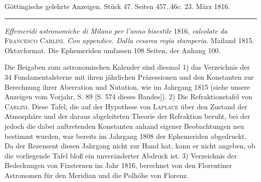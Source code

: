 \clearpage
{}

\begin{center}\small Göttingische gelehrte Anzeigen. Stück 47. Seiten 457..46c. 23. März 1816.\\[3pt]\rule{.72\linewidth}{.3pt}\end{center}

\emph{Effemeridi astronomiche di Milano per l’anno bisestile} 1816, \emph{calcolate da} \textsc{Francesco Carlini}. \emph{Con appendice. Dalla cesarea regia stamperia.} Mailand 1815. Oktavformat. Die Ephemeriden umfassen 108 Seiten, der Anhang 100.

Die Beigaben zum astronomischen Kalender sind diesmal 1) das Verzeichnis der 34 Fundamentalsterne mit ihren jährlichen Präzessionen und den Konstanten zur Berechnung ihrer Aberration und Nutation, wie im Jahrgang 1815 (siehe unsere Anzeigen vom Vorjahr, S. 89 [S. 574 dieses Bandes]). 2) Die Refraktionstafel von \textsc{Carlini}. Diese Tafel, die auf der Hypothese von \textsc{Laplace} über den Zustand der Atmosphäre und der daraus abgeleiteten Theorie der Refraktion beruht, bei der jedoch die dabei auftretenden Konstanten anhand eigener Beobachtungen neu bestimmt wurden, war bereits im Jahrgang 1808 der Ephemeriden abgedruckt. Da der Rezensent diesen Jahrgang nicht zur Hand hat, kann er nicht angeben, ob die vorliegende Tafel bloß ein unveränderter Abdruck ist. 3) Verzeichnis der Bedeckungen von Fixsternen im Jahr 1816, berechnet von den Florentiner Astronomen für den Meridian und die Polhöhe von Florenz.

